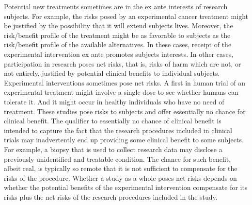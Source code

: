 \documentclass[12p]{article}
\begin{document}
Potential new treatments sometimes are in the ex ante interests of research subjects. For example, the risks posed by an experimental cancer treatment might be justified by the possibility that it will extend subjects lives. Moreover, the risk/benefit profile of the treatment might be as favorable to subjects as the risk/benefit profile of the available alternatives. In these cases, receipt of the experimental intervention ex ante promotes subjects interests. In other cases, participation in research poses net risks, that is, risks of harm which are not, or not entirely, justified by potential clinical benefits to individual subjects. Experimental interventions sometimes pose net risks. A first in human trial of an experimental treatment might involve a single dose to see whether humans can tolerate it. And it might occur in healthy individuals who have no need of treatment. These studies pose risks to subjects and offer essentially no chance for clinical benefit. The qualifier to essentially no chance of clinical benefit is intended to capture the fact that the research procedures included in clinical trials may inadvertently end up providing some clinical benefit to some subjects. For example, a biopsy that is used to collect research data may disclose a previously unidentified and treatable condition. The chance for such benefit, albeit real, is typically so remote that it is not sufficient to compensate for the risks of the procedure. Whether a study as a whole poses net risks depends on whether the potential benefits of the experimental intervention compensate for its risks plus the net risks of the research procedures included in the study.
\end{document}
